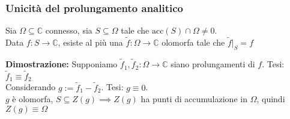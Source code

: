 \documentclass[a4paper]{article}
\newcommand{\C}{\mathbb{C}}
\begin{document}
\subsubsection{Unicità del prolungamento analitico}
\begin{tcolorbox}
	Sia $\Omega \subseteq  \C$ connesso, sia $S \subseteq  \Omega$ tale che $\text{acc}(S)\cap \Omega \neq 0$.
	\\Data $f:S\to \C$, esiste al più una $\tilde f:\Omega\to \C$ olomorfa tale che $\tilde f|_S=f$
\end{tcolorbox}
\textbf{Dimostrazione: }Supponiamo $\tilde f_1,\tilde f_2:\Omega\to \C$ siano prolungamenti di $f$. Tesi: $\tilde f_1\equiv \tilde f_2$
\\Considerando $g:=\tilde f_1-\tilde f_2$. Tesi: $g\equiv 0$.
\\$g$ è olomorfa, $S \subseteq  Z(g)\implies Z(g)$ ha punti di accumulazione in $\Omega$, quindi $Z(g)\equiv \Omega$ 
\end{document}
